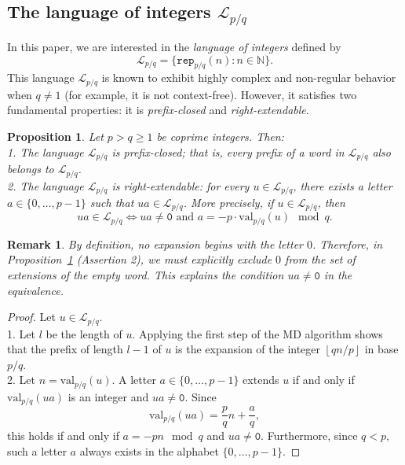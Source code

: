 \documentclass{template_arxiv}
\newtheorem{proposition}[theorem]{Proposition}
\newtheorem{remark}[theorem]{Remark}
\numberwithin{equation}{section}
\newcommand{\lan}{\mathcal{L}}
\newcommand{\val}{\mathrm{val}}
\newcommand{\rep}{\mathtt{rep}}
\begin{document}
\subsection{The language of integers $\lan_{p/q}$}

In this paper, we are interested in the \emph{language of integers} defined by
\[\lan_{p/q} = \{ \rep_{p/q}(n) : n \in \mathbb{N} \}.\]
This language $\lan_{p/q}$ is known to exhibit highly complex and non-regular behavior when $q \neq 1$ (for example, it is not context-free). However, it satisfies two fundamental properties: it is \emph{prefix-closed} and \emph{right-extendable}.

\begin{proposition}\label{prop:closeness_and_extendability} Let $p > q \geq 1$ be coprime integers. Then:\\
	1. The language $\lan_{p/q}$ is prefix-closed; that is, every prefix of a word in $\lan_{p/q}$ also belongs to $\lan_{p/q}$.\\
	2. The language $\lan_{p/q}$ is right-extendable: for every $u \in \lan_{p/q}$, there exists a letter $a \in \{0, \dots, p-1\}$ such that $ua \in \lan_{p/q}$. More precisely, if $u \in \lan_{p/q}$, then 
	\[
	ua \in \lan_{p/q} \iff ua \neq \mathtt{0} \text{ and } a = -p \cdot \val_{p/q}(u) \mod{q}.
	\] 
\end{proposition}

\begin{remark}
	By definition, no expansion begins with the letter $0$. Therefore, in Proposition~\ref{prop:closeness_and_extendability} (Assertion 2), we must explicitly exclude $0$ from the set of extensions of the empty word. This explains the condition $ua \neq \mathtt{0}$ in the equivalence. 
\end{remark}



\begin{proof} Let $u \in \lan_{p/q}$.\\ 
	1. Let $l$ be the length of $u$. Applying the first step of the MD algorithm shows that the prefix of length $l - 1$ of $u$ is the expansion of the integer
	$\left\lfloor qn/p \right\rfloor$
	in  base $p/q$.\\
	2. Let $n = \val_{p/q}(u)$. A letter $a \in \{0,\ldots,p-1\}$ extends $u$ if and only if $\val_{p/q}(ua)$ is an integer and $ua \neq \mathtt{0}$. Since 
	\[
	\val_{p/q}(ua) = \frac{p}{q} n + \frac{a}{q},
	\]
	this holds if and only if $a = -p n \mod{q}$ and $ua \neq \mathtt{0}$.
	Furthermore, since $q < p$, such a letter $a$ always exists in the alphabet $\{0, \dots, p-1\}$.
\end{proof}
\end{document}
